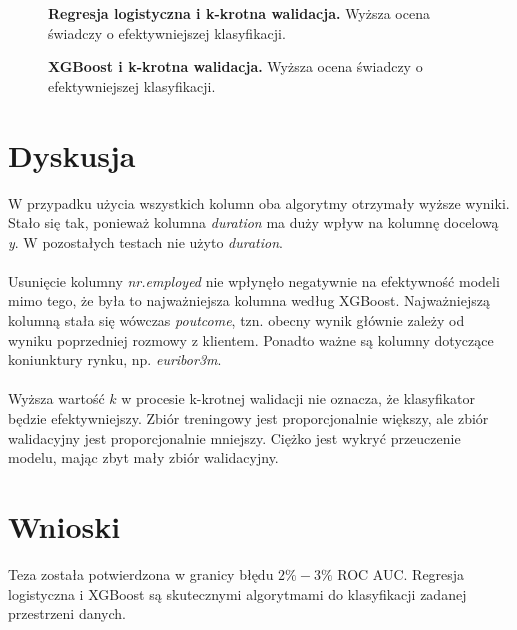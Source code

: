 \documentclass[12pt,a4paper]{article}
\begin{document}
\begin{figure}[H]
	\centering
	\caption{\textbf{Regresja logistyczna i k-krotna walidacja.} Wyższa ocena świadczy o efektywniejszej klasyfikacji.}
\end{figure}

\begin{figure}[H]
	\centering
	\caption{\textbf{XGBoost i k-krotna walidacja.} Wyższa ocena świadczy o efektywniejszej klasyfikacji.}
\end{figure}

\section*{Dyskusja}
W przypadku użycia wszystkich kolumn oba algorytmy otrzymały wyższe wyniki. Stało się tak, ponieważ kolumna \textit{duration} ma duży wpływ na kolumnę docelową \textit{y}. W pozostałych testach nie użyto \textit{duration}.
\\
\\
Usunięcie kolumny \textit{nr.employed} nie wpłynęło negatywnie na efektywność modeli mimo tego, że była to najważniejsza kolumna według XGBoost. Najważniejszą kolumną stała się wówczas \textit{poutcome}, tzn. obecny wynik głównie zależy od wyniku poprzedniej rozmowy z klientem. Ponadto ważne są kolumny dotyczące koniunktury rynku, np. \textit{euribor3m}.
\\
\\
Wyższa wartość $k$ w procesie k-krotnej walidacji nie oznacza, że klasyfikator będzie efektywniejszy. Zbiór treningowy jest proporcjonalnie większy, ale zbiór walidacyjny jest proporcjonalnie mniejszy. Ciężko jest wykryć przeuczenie modelu, mając zbyt mały zbiór walidacyjny.

\section*{Wnioski}
Teza została potwierdzona w granicy błędu $2\%-3\%$ ROC AUC. Regresja logistyczna i XGBoost są skutecznymi algorytmami do klasyfikacji zadanej przestrzeni danych.

\nocite{*}

{}
\end{document}
